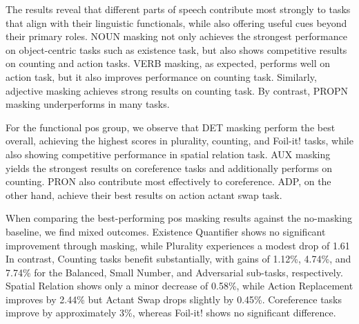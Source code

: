 The results reveal that different parts of speech contribute most strongly to tasks that align with their linguistic functionals, while also offering useful cues beyond their primary roles.
NOUN masking not only achieves the strongest performance on object-centric tasks such as existence task, but also shows competitive results on counting and action tasks.
VERB masking, as expected, performs well on action task, but it also improves performance on counting task.
Similarly, adjective masking achieves strong results on counting task.
By contrast, PROPN masking underperforms in many tasks.

For the functional \acrshort{pos} group, we observe that DET masking perform the best overall, achieving the highest scores in plurality, counting, and Foil-it! tasks, while also showing competitive performance in spatial relation task.
AUX masking yields the strongest results on coreference tasks and additionally performs on counting.
PRON also contribute most effectively to coreference.
ADP, on the other hand, achieve their best results on action actant swap task.

When comparing the best-performing \acrshort{pos} masking results against the no-masking baseline, we find mixed outcomes.
Existence Quantifier shows no significant improvement through masking, while Plurality experiences a modest drop of 1.61%
In contrast, Counting tasks benefit substantially, with gains of 1.12\%, 4.74\%, and 7.74\% for the Balanced, Small Number, and Adversarial sub-tasks, respectively.
Spatial Relation shows only a minor decrease of 0.58\%, while Action Replacement improves by 2.44\% but Actant Swap drops slightly by 0.45\%.
Coreference tasks improve by approximately 3\%, whereas Foil-it! shows no significant difference.

